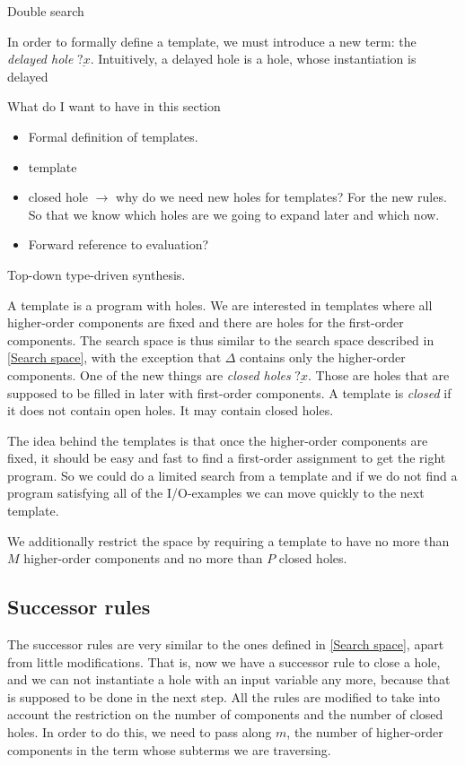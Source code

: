 Double search



In order to formally define a template, we must introduce a new term: the \emph{delayed hole} $\underline{?x}$. Intuitively, a delayed hole is a hole, whose instantiation is delayed

What do I want to have in this section
\begin{itemize}
\item Formal definition of templates.
\item template
\item closed hole $\longrightarrow$ why do we need new holes for templates? For the new rules. So that we know which holes are we going to expand later and which now.
\item Forward reference to evaluation?
\end{itemize}


  Top-down type-driven synthesis.

A template is a program with holes. We are interested in templates where all higher-order components are fixed and there are holes for the first-order components.
The search space is thus similar to the search space described in \ref{Search space}, with the exception that $\Delta$ contains only the higher-order components.
One of the new things are \emph{closed holes} $\underline{?x}$. Those are holes that are supposed to be filled in later with first-order components. A template is \emph{closed} if it does not contain open holes. It may contain closed holes.

The idea behind the templates is that once the higher-order components are fixed, it should be easy and fast to find a first-order assignment to get the right program. So we could do a limited search from a template and if we do not find a program satisfying all of the I/O-examples we can move quickly to the next template.

We additionally restrict the space by requiring a template to have no more than $M$ higher-order components and no more than $P$ closed holes.

  \subsection{Successor rules}

The successor rules are very similar to the ones defined in \ref{Search space}, apart from little modifications. That is, now we have a successor rule to close a hole, and we can not instantiate a hole with an input variable any more, because that is supposed to be done in the next step. All the rules are modified to take into account the restriction on the number of components and the number of closed holes. In order to do this, we need to pass along $m$, the number of higher-order components in the term whose subterms we are traversing.


